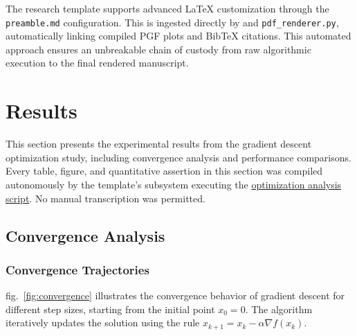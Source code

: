 \documentclass[
  english,
]{article}
\begin{document}
The research template supports advanced LaTeX customization through the
\texttt{preamble.md} configuration. This is ingested directly by
 and
\texttt{pdf\_renderer.py}, automatically linking compiled PGF plots and
BibTeX citations. This automated approach ensures an unbreakable chain
of custody from raw algorithmic execution to the final rendered
manuscript.

\newpage

\section{Results}\label{sec:results}

This section presents the experimental results from the gradient descent
optimization study, including convergence analysis and performance
comparisons. Every table, figure, and quantitative assertion in this
section was compiled autonomously by the template's
 subsystem executing the
\href{https://github.com/docxology/template/blob/main/projects/templates/template_code_project/scripts/optimization_analysis.py}{optimization
analysis script}. No manual transcription was permitted.

\subsection{Convergence Analysis}\label{convergence-analysis-1}

\subsubsection{Convergence Trajectories}\label{convergence-trajectories}

fig.~\ref{fig:convergence} illustrates the convergence behavior of
gradient descent for different step sizes, starting from the initial
point \(x_0 = 0\). The algorithm iteratively updates the solution using
the rule \(x_{k+1} = x_k - \alpha \nabla f(x_k)\).
\end{document}
